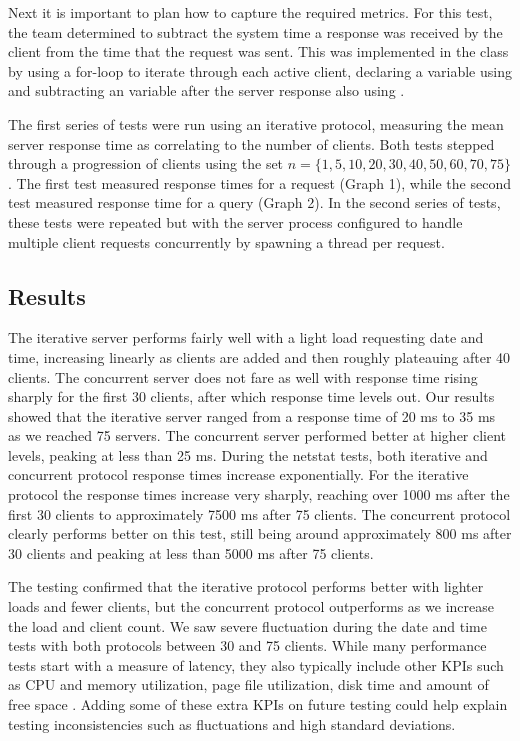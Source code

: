 Next it is important to plan how to capture the required metrics. For this test, the team determined to subtract the system time a response was received by the client from the time that the request was sent. This was implemented in the class  by using a for-loop to iterate through each active client, declaring a  variable using  and subtracting an  variable after the server response also using . 

The first series of tests were run using an iterative protocol, measuring the mean server response time as correlating to the number of clients. Both tests stepped through a progression of clients  using the set  $n = \{1, 5, 10, 20, 30, 40, 50, 60, 70, 75\}$.  
The first test measured response times for a  request (Graph 1), while the second test measured response time for a  query (Graph 2). 
In the second series of tests, these tests were repeated but with the server process configured to handle multiple client requests concurrently by spawning a thread per request.

\subsection{Results}

The iterative server performs fairly well with a light load requesting date and time, increasing linearly as clients are added and then roughly plateauing after 40 clients. 
The concurrent server does not fare as well with response time rising sharply for the first 30 clients, after which response time levels out. 
Our results showed that the iterative server ranged from a response time of 20 ms to 35 ms as we reached 75 servers.
The concurrent server performed better at higher client levels, peaking at less than 25 ms. 
During the netstat tests, both iterative and concurrent protocol response times increase exponentially. 
For the iterative protocol the response times increase very sharply, reaching over 1000 ms after the first 30 clients to approximately 7500 ms after 75 clients. 
The concurrent protocol clearly performs better on this test, still being around approximately 800 ms after 30 clients and peaking at less than 5000 ms after 75 clients. 

The testing confirmed that the iterative protocol performs better with lighter loads and fewer clients, but the concurrent protocol outperforms as we increase the load and client count.
We saw severe fluctuation during the date and time tests with both protocols between 30 and 75 clients. 
While many performance tests start with a measure of latency, they also typically include other KPIs such as CPU and memory utilization, page file utilization, disk time and amount of free space
\cite{molyneaux}.
Adding some of these extra KPIs on future testing could help explain testing inconsistencies such as fluctuations and high standard deviations.
